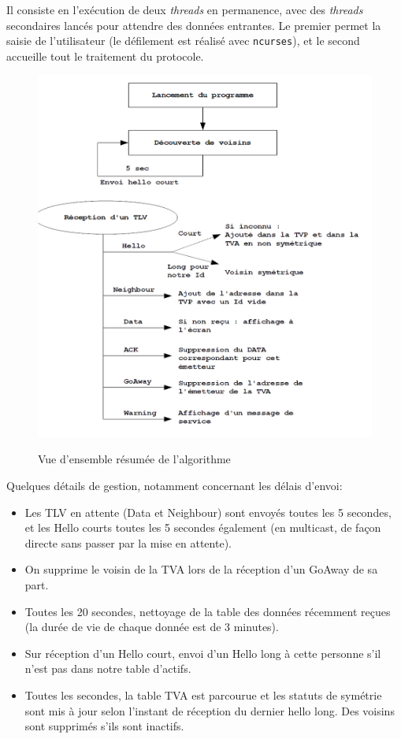 \documentclass[11pt,a4paper]{article}
\begin{document}
	Il consiste en l'exécution de deux \emph{threads} en permanence, avec des \emph{threads} secondaires lancés pour attendre des données entrantes.
	Le premier permet la saisie de l'utilisateur (le défilement est réalisé avec \texttt{ncurses}), et le second accueille tout le traitement du protocole.
	
	\begin{figure}[ht!]
		\centering
			\includegraphics[width=.8\columnwidth]{img.png}
		\label{fig:img}
		\caption{Vue d'ensemble résumée de l'algorithme}
	\end{figure}
	
	Quelques détails de gestion, notamment concernant les délais d'envoi:
	
	\begin{itemize}
		\item 	Les TLV en attente (Data et Neighbour) sont envoyés toutes les 5 secondes, et les Hello courts toutes les 5 secondes également (en multicast, de façon 	directe sans passer par la mise en attente).
	
	\item On supprime le voisin de la TVA lors de la réception d'un GoAway de sa part.
	
	\item Toutes les 20 secondes, nettoyage de la table des données récemment reçues (la durée de vie de chaque donnée est de 3 minutes).
	
	\item Sur réception d'un Hello court, envoi d'un Hello long à cette personne s'il n'est pas dans notre table d'actifs.
	
	\item  Toutes les secondes, la table TVA est parcourue et les statuts de symétrie sont mis à jour selon l'instant de réception du dernier hello long.
	Des voisins sont supprimés s'ils sont inactifs.

	\end{itemize}
	
\end{document}
